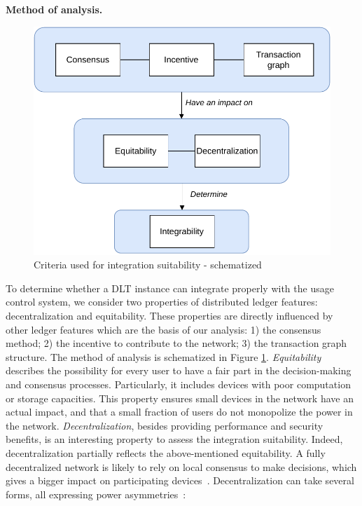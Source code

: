 \textbf{Method of analysis.}
\begin{figure}[t]
\centering
 \includegraphics[scale=0.75]{Images/analysis.pdf}
\caption{Criteria used for integration suitability - schematized}
\label{F_analysis}
\end{figure}
To determine whether a DLT instance can integrate properly with the usage control system, we consider two properties of distributed ledger features: decentralization and equitability. These properties are directly influenced by other ledger features which are the basis of our analysis: 1) the consensus method; 2) the incentive to contribute to the network; 3) the transaction graph structure. The method of analysis is schematized in Figure \ref{F_analysis}.
\emph{Equitability} describes the possibility for every user to have a fair part in the decision-making and consensus processes. Particularly, it includes devices with poor computation or storage capacities. This property ensures small devices in the network have an actual impact, and that a small fraction of users do not monopolize the power in the network.
\emph{Decentralization}, besides providing performance and security benefits, is an interesting property to assess the integration suitability. Indeed, decentralization partially reflects the above-mentioned equitability. A fully decentralized network is likely to rely on local consensus to make decisions, which gives a bigger impact on participating devices~\cite{Popov2020, Steen2020}. %
Decentralization can take several forms, all expressing power asymmetries~\cite{Bodo2021}:  %

